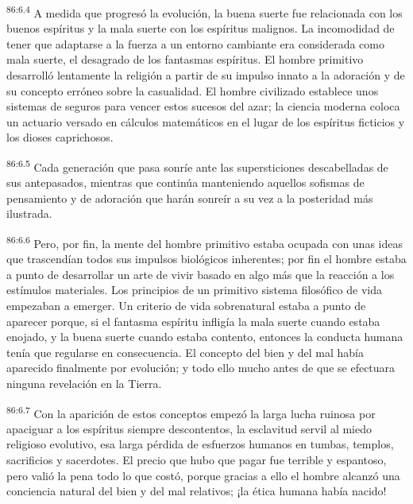 \documentclass[twoside, 11pt]{book}
\begin{document}
\par
\textsuperscript{86:6.4} A medida que progresó la evolución, la buena suerte fue relacionada con los buenos espíritus y la mala suerte con los espíritus malignos. La incomodidad de tener que adaptarse a la fuerza a un entorno cambiante era considerada como mala suerte, el desagrado de los fantasmas espíritus. El hombre primitivo desarrolló lentamente la religión a partir de su impulso innato a la adoración y de su concepto erróneo sobre la casualidad. El hombre civilizado establece unos sistemas de seguros para vencer estos sucesos del azar; la ciencia moderna coloca un actuario versado en cálculos matemáticos en el lugar de los espíritus ficticios y los dioses caprichosos.

\par
\textsuperscript{86:6.5} Cada generación que pasa sonríe ante las supersticiones descabelladas de sus antepasados, mientras que continúa manteniendo aquellos sofismas de pensamiento y de adoración que harán sonreír a su vez a la posteridad más ilustrada.

\par
\textsuperscript{86:6.6} Pero, por fin, la mente del hombre primitivo estaba ocupada con unas ideas que trascendían todos sus impulsos biológicos inherentes; por fin el hombre estaba a punto de desarrollar un arte de vivir basado en algo más que la reacción a los estímulos materiales. Los principios de un primitivo sistema filosófico de vida empezaban a emerger. Un criterio de vida sobrenatural estaba a punto de aparecer porque, si el fantasma espíritu infligía la mala suerte cuando estaba enojado, y la buena suerte cuando estaba contento, entonces la conducta humana tenía que regularse en consecuencia. El concepto del bien y del mal había aparecido finalmente por evolución; y todo ello mucho antes de que se efectuara ninguna revelación en la Tierra.

\par
\textsuperscript{86:6.7} Con la aparición de estos conceptos empezó la larga lucha ruinosa por apaciguar a los espíritus siempre descontentos, la esclavitud servil al miedo religioso evolutivo, esa larga pérdida de esfuerzos humanos en tumbas, templos, sacrificios y sacerdotes. El precio que hubo que pagar fue terrible y espantoso, pero valió la pena todo lo que costó, porque gracias a ello el hombre alcanzó una conciencia natural del bien y del mal relativos; ¡la ética humana había nacido!
\end{document}

